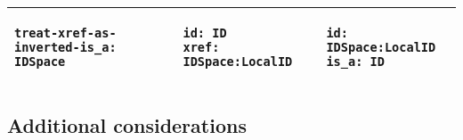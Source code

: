 \begin{scriptsize}
\begin{table}
\begin{tabular}{ | p{5cm} | p{5cm} | p{5cm} |}
\hline
\begin{verbatim}
treat-xref-as-inverted-is_a: IDSpace
\end{verbatim}
&
\begin{verbatim}
id: ID
xref: IDSpace:LocalID
\end{verbatim}
&
\begin{verbatim}
id: IDSpace:LocalID
is_a: ID
\end{verbatim}
\\

\hline
\end{tabular}
\end{table}
\end{scriptsize}


\subsection{Additional considerations}
